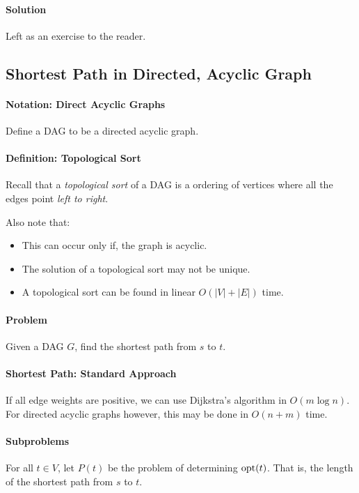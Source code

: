 \paragraph{Solution}
Left as an exercise to the reader.

\subsection{Shortest Path in Directed, Acyclic Graph}
\paragraph{Notation: Direct Acyclic Graphs}
Define a DAG to be a directed acyclic graph.

\paragraph{Definition: Topological Sort}
Recall that a \textit{topological sort} of a DAG is a ordering of vertices
where all the edges point  \textit{left to right}.

Also note that:
\begin{itemize}
  \item This can occur only if, the graph is acyclic.
  \item The solution of a topological sort may not be unique.
  \item A topological sort can be found in linear \(O(|V| + |E|)\) time.
\end{itemize}

\paragraph{Problem}
Given a DAG \(G\), find the shortest path from \(s\) to \(t\).

\paragraph{Shortest Path: Standard Approach}
If all edge weights are positive, we can use Dijkstra's algorithm in \(O(m \log n)\).
For directed acyclic graphs however, this may be done in \(O(n + m)\) time.

\paragraph{Subproblems}
For all \(t \in V\), let \(P(t)\) be the problem of determining  \(\mathrm{opt}(t)\).
That is, the length of the shortest path from  \(s\) to  \(t\).

